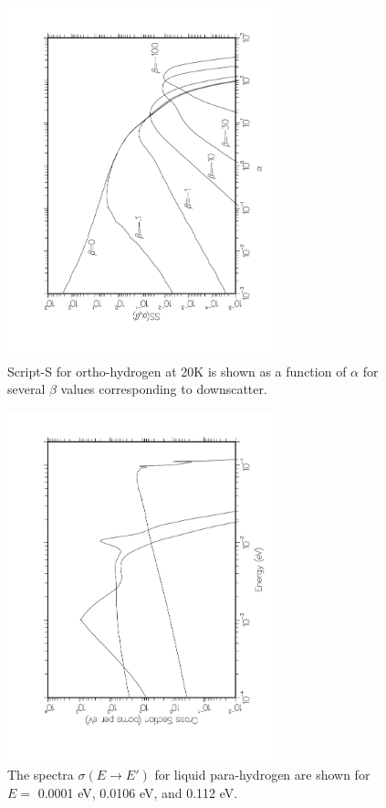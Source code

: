 \begin{figure}[tp]\centering
\includegraphics[keepaspectratio, height=4.0in, angle=270]{figs/le12back}
\caption[script-S vs alpha for ortho-hydrogen]{Script-S for ortho-hydrogen at
 20K is shown as a function of $\alpha$ for several $\beta$ values
 corresponding to downscatter.}
\label{fig12b}
\end{figure}

\begin{figure}[tp]\centering
\includegraphics[keepaspectratio, height=4.0in, angle=270]{figs/le13ack}
\caption[Para-hydrogen neutron spectra]{The spectra
 $\sigma(E{\rightarrow}E')$ for liquid para-hydrogen are
 shown for $E{=}$ 0.0001 eV, 0.0106 eV, and 0.112 eV.}
\label{fig13}
\end{figure}

